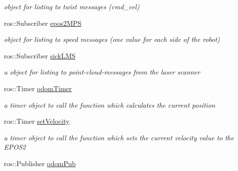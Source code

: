 \begin{DoxyCompactItemize}
\begin{DoxyCompactList}\small\item\em object for listing to twist messages (cmd\-\_\-vel) \end{DoxyCompactList}\item 
\hypertarget{structTankSteering_1_1tankSet_a060a7d28692189eb3fae35364a36af4c}{ros\-::\-Subscriber \hyperlink{structTankSteering_1_1tankSet_a060a7d28692189eb3fae35364a36af4c}{epos2\-M\-P\-S}}\label{structTankSteering_1_1tankSet_a060a7d28692189eb3fae35364a36af4c}

\begin{DoxyCompactList}\small\item\em object for listing to speed messages (one value for each side of the robot) \end{DoxyCompactList}\item 
\hypertarget{structTankSteering_1_1tankSet_a6c3c336a6adc81a2ec23389d5a6f69c4}{ros\-::\-Subscriber \hyperlink{structTankSteering_1_1tankSet_a6c3c336a6adc81a2ec23389d5a6f69c4}{sick\-L\-M\-S}}\label{structTankSteering_1_1tankSet_a6c3c336a6adc81a2ec23389d5a6f69c4}

\begin{DoxyCompactList}\small\item\em a object for listing to point-\/cloud-\/messages from the laser scanner \end{DoxyCompactList}\item 
\hypertarget{structTankSteering_1_1tankSet_aa0c689559cc4b8217b66d752ed9c5514}{ros\-::\-Timer \hyperlink{structTankSteering_1_1tankSet_aa0c689559cc4b8217b66d752ed9c5514}{odom\-Timer}}\label{structTankSteering_1_1tankSet_aa0c689559cc4b8217b66d752ed9c5514}

\begin{DoxyCompactList}\small\item\em a timer object to call the function which calculates the current position \end{DoxyCompactList}\item 
\hypertarget{structTankSteering_1_1tankSet_acbbb0676b14d02706ad100abee4a22c8}{ros\-::\-Timer \hyperlink{structTankSteering_1_1tankSet_acbbb0676b14d02706ad100abee4a22c8}{set\-Velocity}}\label{structTankSteering_1_1tankSet_acbbb0676b14d02706ad100abee4a22c8}

\begin{DoxyCompactList}\small\item\em a timer object to call the function which sets the current velocity value to the E\-P\-O\-S2 \end{DoxyCompactList}\item 
\hypertarget{structTankSteering_1_1tankSet_a49304224faeac566fc964cbc98135499}{ros\-::\-Publisher \hyperlink{structTankSteering_1_1tankSet_a49304224faeac566fc964cbc98135499}{odom\-Pub}}\label{structTankSteering_1_1tankSet_a49304224faeac566fc964cbc98135499}


\end{DoxyCompactItemize}
